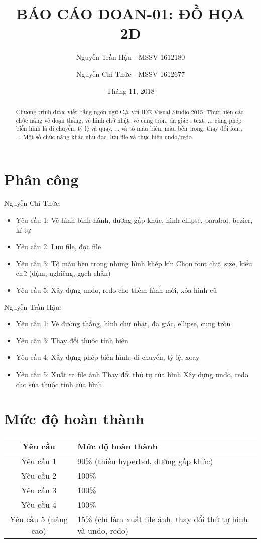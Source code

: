 \documentclass[12pt]{article}
\title{BÁO CÁO DOAN-01: ĐỒ HỌA 2D}
\author{Nguyễn Trần Hậu - MSSV 1612180 \and Nguyễn Chí Thức - MSSV 1612677}
\date{Tháng 11, 2018}
\begin{document}
\maketitle
\newpage
\tableofcontents
\newpage

\begin{abstract}
Chương trình được viết bằng ngôn ngữ C\# với IDE Visual Studio 2015.
Thực hiện các chức năng vẽ đoạn thẳng, vẽ hình chữ nhật, vẽ cung tròn, đa giác , text, ...
cùng phép biến hình là di chuyển, tỷ lệ và quay, ...
và tô màu biên, màu bên trong, thay đổi font, ...
Một số chức năng khác như đọc, lưu file và thực hiện undo/redo.
\end{abstract}

\section{Phân công}
Nguyễn Chí Thức:
\begin{itemize}
\item Yêu cầu 1: Vẽ hình bình hành, đường gấp khúc, hình ellipse, parabol, bezier, kí tự
\item Yêu cầu 2: Lưu file, đọc file
\item Yêu cầu 3:
\subitem Tô màu bên trong những hình khép kín
\subitem Chọn font chữ, size, kiểu chữ (đậm, nghiêng, gạch chân)
\item Yêu cầu 5:
\subitem Xây dựng undo, redo cho thêm hình mới, xóa hình cũ
\end{itemize}

Nguyễn Trần Hậu:
\begin{itemize}
\item Yêu cầu 1: Vẽ đường thẳng, hình chữ nhật, đa giác, ellipse, cung tròn
\item Yêu cầu 3:
\subitem Thay đổi thuộc tính biên
\item Yêu cầu 4: Xây dựng phép biến hình: di chuyển, tỷ lệ, xoay
\item Yêu cầu 5:
\subitem Xuất ra file ảnh
\subitem Thay đổi thứ tự của hình
\subitem Xây dựng undo, redo cho sửa thuộc tính của hình
\end{itemize}

\section{Mức độ hoàn thành}
\begin{tabular}[H]{| c | p{6cm} |}
\hline
\textbf{Yêu cầu} & \textbf{Mức độ hoàn thành} \\
\hline
Yêu cầu 1 & 90\% (thiếu hyperbol, đường gấp khúc) \\
\hline
Yêu cầu 2 & 100\% \\
\hline
Yêu cầu 3 & 100\% \\
\hline
Yêu cầu 4 & 100\% \\
\hline
Yêu cầu 5 (nâng cao) & 15\% (chỉ làm xuất file ảnh, thay đổi thứ tự hình và undo, redo) \\
\hline
\end{tabular}
\end{document}
